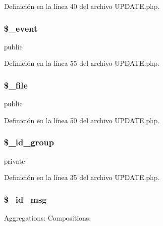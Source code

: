 Definición en la línea 40 del archivo U\-P\-D\-A\-T\-E.\-php.

\hypertarget{classUPDATE_ad6c677c9355a932f4eb84a01ddf072c4}{
\subsubsection[{\$\-\_\-event}]{\setlength{\rightskip}{0pt plus 5cm}\$\-\_\-event}}\label{classUPDATE_ad6c677c9355a932f4eb84a01ddf072c4}
public 

Definición en la línea 55 del archivo U\-P\-D\-A\-T\-E.\-php.

\hypertarget{classUPDATE_abddaf0b77086e2b7d920f5d1a9616889}{
\subsubsection[{\$\-\_\-file}]{\setlength{\rightskip}{0pt plus 5cm}\$\-\_\-file}}\label{classUPDATE_abddaf0b77086e2b7d920f5d1a9616889}
public 

Definición en la línea 50 del archivo U\-P\-D\-A\-T\-E.\-php.

\hypertarget{classUPDATE_aa323e6443296a4fc52d5783e8f1416e1}{
\subsubsection[{\$\-\_\-id\-\_\-group}]{\setlength{\rightskip}{0pt plus 5cm}\$\-\_\-id\-\_\-group\hspace{0.3cm}{\ttfamily [private]}}}\label{classUPDATE_aa323e6443296a4fc52d5783e8f1416e1}
private 

Definición en la línea 35 del archivo U\-P\-D\-A\-T\-E.\-php.

\hypertarget{classUPDATE_a63808e734406ff8eae9fc3dac25fca22}{
\subsubsection[{\$\-\_\-id\-\_\-msg}]{\setlength{\rightskip}{0pt plus 5cm}\$\-\_\-id\-\_\-msg\hspace{0.3cm}{\ttfamily [private]}}}\label{classUPDATE_a63808e734406ff8eae9fc3dac25fca22}
Aggregations\-: Compositions\-:

